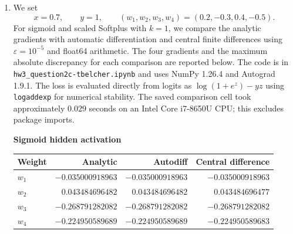 \documentclass[12pt]{article}
\let\epsilon\varepsilon
\begin{document}
\begin{enumerate}
\begin{enumerate}[label=\textbf{\Alph*.}, leftmargin=*]
       ReLU is differentiable for $u\neq0$, with derivative 0 for
       $u<0$ and 1 for $u>0$. At $u=0$, its ordinary derivative does
       not exist, but we can choose a value for the purposes of backpropogation. Since $u=0$ is the boundary between a zero and non-zero derivative, a choice of $0$ for the derivative makes sense, but we could choose another value between $0$ and $1$ instead. This supplies a value
       for the chain-rule factor when a unit's input is exactly zero,
       allowing backpropagation to proceed. Choosing 1 is also valid,
       but does not change the zero derivative for negative inputs.
       Thus the smooth activation $\phi$ is an alternative to ReLU,
       rather than a prerequisite for training with ReLU.

       \item We set 
       \[
           x=0.7,\qquad y=1,\qquad
           (w_1,w_2,w_3,w_4)=(0.2,-0.3,0.4,-0.5).
       \]
       For sigmoid and scaled Softplus with $k=1$, we compare the
       analytic gradients with automatic differentiation and central
       finite differences using $\epsilon=10^{-5}$ and float64
       arithmetic. The four gradients and the maximum absolute
       discrepancy for each comparison are reported below. The code is in
       \texttt{hw3\_question2c-tbelcher.ipynb} and uses NumPy 1.26.4
       and Autograd 1.9.1. The loss is evaluated directly from logits as
       $\log(1+e^z)-yz$ using \texttt{logaddexp} for numerical stability.
       The saved comparison cell took approximately $0.029$ seconds
       on an Intel Core i7-8650U CPU; this excludes package imports.

       \begin{center}
       \textbf{Sigmoid hidden activation}

       {\small
       \begin{tabular}{l r r r}
           \toprule
           Weight & Analytic & Autodiff & Central difference \\
           \midrule
           $w_1$ & $-0.035000918963$ & $-0.035000918963$ & $-0.035000918963$ \\
           $w_2$ & $ 0.043484696482$ & $ 0.043484696482$ & $ 0.043484696477$ \\
           $w_3$ & $-0.268791282082$ & $-0.268791282082$ & $-0.268791282082$ \\
           $w_4$ & $-0.224950589689$ & $-0.224950589689$ & $-0.224950589683$ \\
           \bottomrule
       \end{tabular}}
       \end{center}


\end{enumerate}
\end{enumerate}
\end{document}
